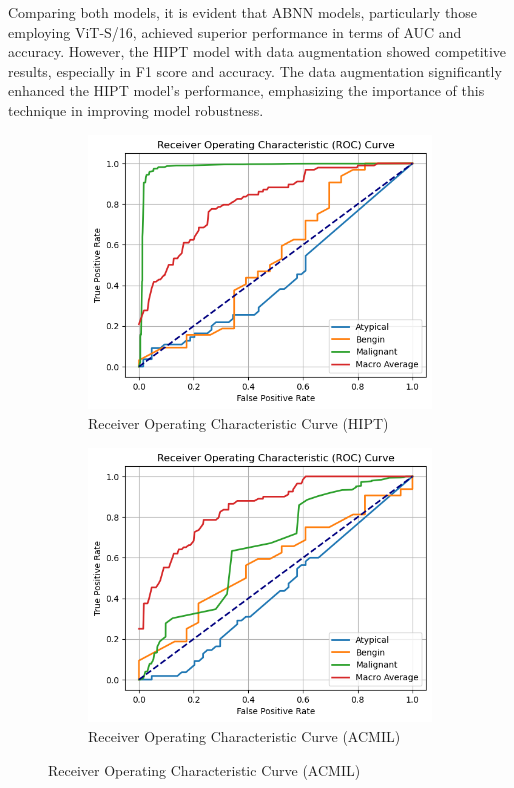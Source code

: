 \documentclass[
11pt, %
english, %
singlespacing, %
headsepline, %
]{project_structure}
\begin{document}
\noindent Comparing both models, it is evident that ABNN models, particularly those employing ViT-S/16, achieved superior performance in terms of AUC and accuracy. However, the HIPT model with data augmentation showed competitive results, especially in F1 score and accuracy. The data augmentation significantly enhanced the HIPT model's performance, emphasizing the importance of this technique in improving model robustness.\\

\begin{figure}[ht]
     \centering
     \begin{subfigure}[b]{0.45\textwidth}
         \centering
         \includegraphics[width=\textwidth]{figures/expirements_and_results/hipt_roc.png}
         \caption{Receiver Operating Characteristic Curve (HIPT)}
     \end{subfigure}
     \hfill
     \begin{subfigure}[b]{0.45\textwidth}
         \centering
         \includegraphics[width=\textwidth]{figures/expirements_and_results/acmil_roc.png}
         \caption{Receiver Operating Characteristic Curve (ACMIL)}
     \end{subfigure}
\end{figure}
\end{document}

